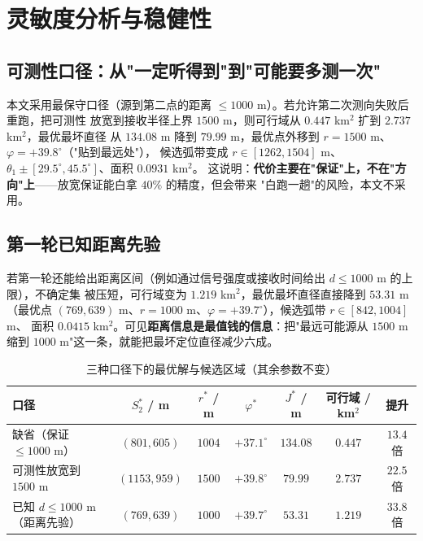 \section{灵敏度分析与稳健性}\label{sec:sens}

\subsection{可测性口径：从"一定听得到"到"可能要多测一次"}

本文采用最保守口径（源到第二点的距离 $\le1000$ m）。若允许第二次测向失败后重跑，把可测性
放宽到接收半径上界 $1500$ m，则可行域从 $0.447$ km$^2$ 扩到 $2.737$ km$^2$，最优最坏直径
从 $134.08$ m 降到 $79.99$ m，最优点外移到 $r=1500$ m、$\varphi=+39.8^\circ$（"贴到最远处"），
候选弧带变成 $r\in[1262,1504]$ m、$\theta_1\pm[29.5^\circ,45.5^\circ]$、面积 $0.0931$ km$^2$。
这说明：\textbf{代价主要在"保证"上，不在"方向"上}——放宽保证能白拿 $40\%$ 的精度，但会带来
"白跑一趟"的风险，本文不采用。

\subsection{第一轮已知距离先验}

若第一轮还能给出距离区间（例如通过信号强度或接收时间给出 $d\le1000$ m 的上限），不确定集
被压短，可行域变为 $1.219$ km$^2$，最优最坏直径直接降到 $53.31$ m（最优点
$(769,639)$ m、$r=1000$ m、$\varphi=+39.7^\circ$），候选弧带 $r\in[842,1004]$ m、
面积 $0.0415$ km$^2$。可见\textbf{距离信息是最值钱的信息}：把"最远可能源从 $1500$ m 缩到
$1000$ m"这一条，就能把最坏定位直径减少六成。

\begin{table}[H]
  \centering
  \caption{三种口径下的最优解与候选区域（其余参数不变）}
  \label{tab:sens}
  \small
  \setlength{\tabcolsep}{5pt}
  \begin{tabular}{lcccccc}
    \toprule
    \textbf{口径} & $S_2^*$ / m & $r^*$ / m & $\varphi^*$ & $J^*$ / m & \textbf{可行域 / km$^2$} & \textbf{提升} \\
    \midrule
    缺省（保证 $\le1000$ m）        & $(801,605)$   & $1004$ & $+37.1^\circ$ & $134.08$ & $0.447$ & $13.4$ 倍 \\
    可测性放宽到 $1500$ m           & $(1153,959)$  & $1500$ & $+39.8^\circ$ & $79.99$  & $2.737$ & $22.5$ 倍 \\
    已知 $d\le1000$ m（距离先验）   & $(769,639)$   & $1000$ & $+39.7^\circ$ & $53.31$  & $1.219$ & $33.8$ 倍 \\
    \bottomrule
  \end{tabular}
\end{table}

